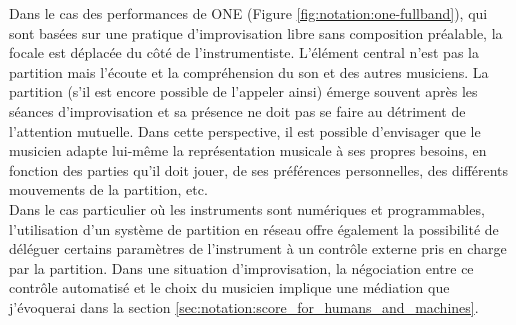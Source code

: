 \noindent Dans le cas des performances de ONE (Figure \ref{fig:notation:one-fullband}), qui sont basées sur une pratique d'improvisation libre sans composition préalable, la focale est déplacée du côté de l'instrumentiste. L'élément central n'est pas la partition mais l'écoute et la compréhension du son et des autres musiciens. La partition (s'il est encore possible de l'appeler ainsi) émerge souvent après les séances d'improvisation et sa présence ne doit pas se faire au détriment de l'attention mutuelle. Dans cette perspective, il est possible d'envisager que le musicien adapte lui-même la représentation musicale à ses propres besoins, en fonction des parties qu'il doit jouer, de ses préférences personnelles, des différents mouvements de la partition, etc.\\
\indent Dans le cas particulier où les instruments sont numériques et programmables, l'utilisation d'un système de partition en réseau offre également la possibilité de déléguer certains paramètres de l'instrument à un contrôle externe pris en charge par la partition. Dans une situation d'improvisation, la négociation entre ce contrôle automatisé et le choix du musicien implique une médiation que j'évoquerai dans la section \ref{sec:notation:score_for_humans_and_machines}.

